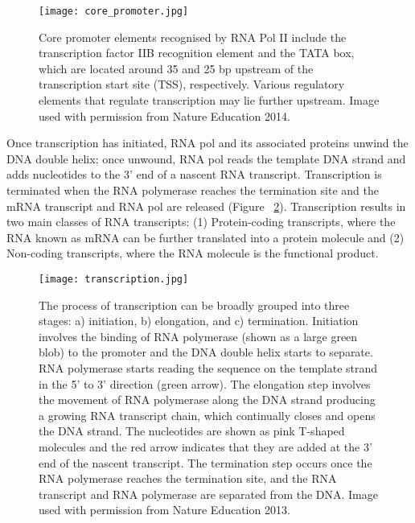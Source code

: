 \begin{figure}[!ht]
   \centering
   \texttt{[image: core\_promoter.jpg]}
   \caption[Core promoter elements]{Core promoter elements recognised by RNA Pol II include the transcription factor IIB recognition element and the TATA box, which are located around 35 and 25 bp upstream of the transcription start site (TSS), respectively. Various regulatory elements that regulate transcription may lie further upstream. Image used with permission from Nature Education 2014.}
   \label{fig:core_promoter}
\end{figure}

Once transcription has initiated, RNA pol and its associated proteins unwind the DNA double helix; once unwound, RNA pol reads the template DNA strand and adds nucleotides to the 3' end of a nascent RNA transcript. Transcription is terminated when the RNA polymerase reaches the termination site and the mRNA transcript and RNA pol are released (Figure ~\ref{fig:transcription}). Transcription results in two main classes of RNA transcripts: (1) Protein-coding transcripts, where the RNA known as mRNA can be further translated into a protein molecule and (2) Non-coding transcripts, where the RNA molecule is the functional product.

\begin{figure}[!ht]
   \centering
   \texttt{[image: transcription.jpg]}
   \caption[DNA transcription]{The process of transcription can be broadly grouped into three stages: a) initiation, b) elongation, and c) termination. Initiation involves the binding of RNA polymerase (shown as a large green blob) to the promoter and the DNA double helix starts to separate. RNA polymerase starts reading the sequence on the template strand in the 5' to 3' direction (green arrow). The elongation step involves the movement of RNA polymerase along the DNA strand producing a growing RNA transcript chain, which continually closes and opens the DNA strand. The nucleotides are shown as pink T-shaped molecules and the red arrow indicates that they are added at the 3' end of the nascent transcript. The termination step occurs once the RNA polymerase reaches the termination site, and the RNA transcript and RNA polymerase are separated from the DNA. Image used with permission from Nature Education 2013.}
   \label{fig:transcription}
\end{figure}

